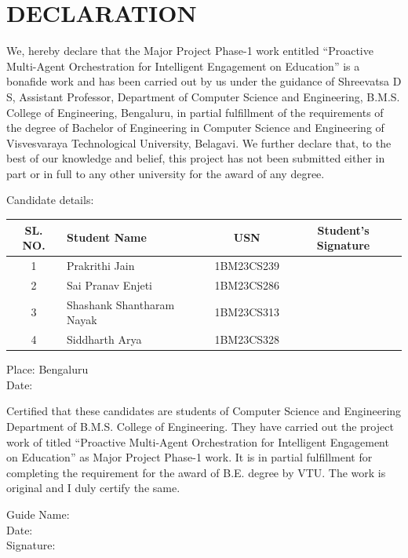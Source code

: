 \documentclass[12pt,a4paper]{report}
\newcommand{\projecttitle}{Proactive Multi-Agent Orchestration for Intelligent Engagement on Education}
\newcommand{\firststudentname}{Prakrithi Jain}
\newcommand{\firststudentusn}{1BM23CS239}
\newcommand{\secondstudentname}{Sai Pranav Enjeti}
\newcommand{\secondstudentusn}{1BM23CS286}
\newcommand{\thirdstudentname}{Shashank Shantharam Nayak}
\newcommand{\thirdstudentusn}{1BM23CS313}
\newcommand{\fourthstudentname}{Siddharth Arya}
\newcommand{\fourthstudentusn}{1BM23CS328}
\newcommand{\guide}{Shreevatsa D S}
\newcommand{\guidedesignation}{Assistant Professor}
\begin{document}
\chapter*{DECLARATION}
\thispagestyle{empty}
We, hereby declare that the Major Project Phase-1 work entitled \enquote{\projecttitle} is a bonafide work and has been carried out  by us under the guidance of \guide, \guidedesignation, Department of  Computer Science and Engineering, B.M.S. College of Engineering, Bengaluru, in partial  fulfillment of the requirements of the degree of Bachelor of Engineering in Computer Science  and Engineering of Visvesvaraya Technological University, Belagavi. 
We further declare that, to the best of our knowledge and belief, this project has not been submitted either in part or in full to any other university for the award of any degree. 
\vspace{0.3cm}
\begin{flushleft}
Candidate details: 
\end{flushleft}
\vspace{0.1cm}
\begin{center}
\begin{tabular}{|c|l|c|c|}
\hline
\textbf{SL. NO.} & \textbf{Student Name} & \textbf{USN} & \textbf{Student’s Signature} \\
\hline
1 & \firststudentname & \firststudentusn & \\
\hline
2 & \secondstudentname & \secondstudentusn & \\
\hline
3 & \thirdstudentname & \thirdstudentusn & \\
\hline
4 & \fourthstudentname & \fourthstudentusn & \\
\hline
\end{tabular}
\end{center}
\begin{flushleft}
Place: Bengaluru \\
Date: \\
\end{flushleft}
Certified that these candidates are students of Computer Science and Engineering Department  of B.M.S. College of Engineering. They have carried out the project work of titled \enquote{\projecttitle} as Major Project Phase-1  work. It is in partial fulfillment for completing the requirement for the award of B.E. degree by VTU. The work is original and I duly certify the same.  
\vspace{1cm}
\begin{flushleft}
Guide Name: \\
Date: \\
Signature: \\ 
\end{flushleft}
\end{document}
